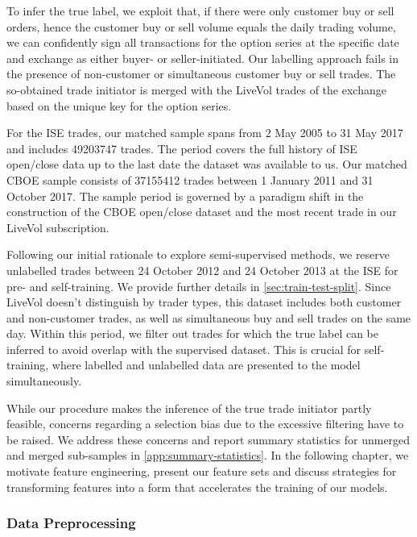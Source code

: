 To infer the true label, we exploit that, if there were only customer buy or sell orders, hence the customer buy or sell volume equals the daily trading volume, we can confidently sign all transactions for the option series at the specific date and exchange as either buyer- or seller-initiated. Our labelling approach fails in the presence of non-customer or simultaneous customer buy or sell trades. The so-obtained trade initiator is merged with the LiveVol trades of the exchange based on the unique key for the option series.

For the \gls{ISE} trades, our matched sample spans from 2 May 2005 to 31 May 2017 and includes \num{49203747} trades. The period covers the full history of \gls{ISE} open/close data up to the last date the dataset was available to us. Our matched \gls{CBOE} sample consists of \num{37155412} trades between 1 January 2011 and 31 October 2017. The sample period is governed by a paradigm shift in the construction of the \gls{CBOE} open/close dataset and the most recent trade in our LiveVol subscription.

Following our initial rationale to explore semi-supervised methods, we reserve unlabelled trades between 24 October 2012 and 24 October 2013 at the \gls{ISE} for pre- and self-training. We provide further details in \cref{sec:train-test-split}. Since LiveVol doesn't distinguish by trader types, this dataset includes both customer and non-customer trades, as well as simultaneous buy and sell trades on the same day. Within this period, we filter out trades for which the true label can be inferred to avoid overlap with the supervised dataset. This is crucial for self-training, where labelled and unlabelled data are presented to the model simultaneously.

While our procedure makes the inference of the true trade initiator partly feasible, concerns regarding a selection bias due to the excessive filtering have to be raised. We address these concerns and report summary statistics for unmerged and merged sub-samples in \cref{app:summary-statistics}. In the following chapter, we motivate feature engineering, present our feature sets and discuss strategies for transforming features into a form that accelerates the training of our models.

\subsubsection{Data Preprocessing}\label{sec:data-preprocessing}

